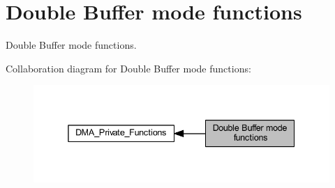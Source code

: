 \hypertarget{group___d_m_a___group3}{}\section{Double Buffer mode functions}
\label{group___d_m_a___group3}


Double Buffer mode functions.  


Collaboration diagram for Double Buffer mode functions\+:\nopagebreak
\begin{figure}[H]
\begin{center}
\leavevmode
\includegraphics[width=338pt]{group___d_m_a___group3}
\end{center}
\end{figure}
